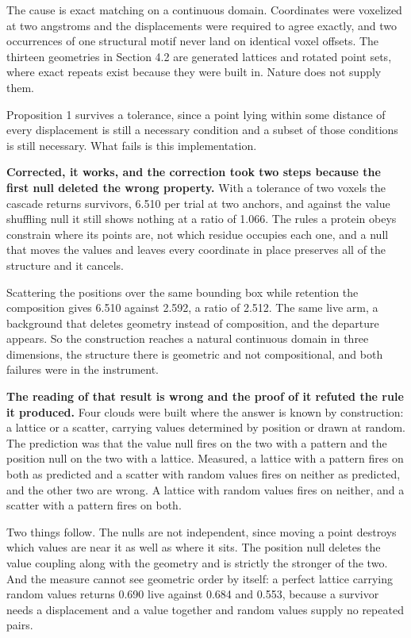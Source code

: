 The cause is exact matching on a continuous domain. Coordinates were voxelized at two angstroms and the displacements were required to agree exactly, and two occurrences of one structural motif never land on identical voxel offsets. The thirteen geometries in Section 4.2 are generated lattices and rotated point sets, where exact repeats exist because they were built in. Nature does not supply them.

Proposition 1 survives a tolerance, since a point lying within some distance of every displacement is still a necessary condition and a subset of those conditions is still necessary. What fails is this implementation.

\textbf{Corrected, it works, and the correction took two steps because the first null deleted the wrong property.} With a tolerance of two voxels the cascade returns survivors, 6.510 per trial at two anchors, and against the value shuffling null it still shows nothing at a ratio of 1.066. The rules a protein obeys constrain where its points are, not which residue occupies each one, and a null that moves the values and leaves every coordinate in place preserves all of the structure and it cancels.

Scattering the positions over the same bounding box while retention the composition gives 6.510 against 2.592, a ratio of 2.512. The same live arm, a background that deletes geometry instead of composition, and the departure appears. So the construction reaches a natural continuous domain in three dimensions, the structure there is geometric and not compositional, and both failures were in the instrument.

\textbf{The reading of that result is wrong and the proof of it refuted the rule it produced.} Four clouds were built where the answer is known by construction: a lattice or a scatter, carrying values determined by position or drawn at random. The prediction was that the value null fires on the two with a pattern and the position null on the two with a lattice. Measured, a lattice with a pattern fires on both as predicted and a scatter with random values fires on neither as predicted, and the other two are wrong. A lattice with random values fires on neither, and a scatter with a pattern fires on both.

Two things follow. The nulls are not independent, since moving a point destroys which values are near it as well as where it sits. The position null deletes the value coupling along with the geometry and is strictly the stronger of the two. And the measure cannot see geometric order by itself: a perfect lattice carrying random values returns 0.690 live against 0.684 and 0.553, because a survivor needs a displacement and a value together and random values supply no repeated pairs.

